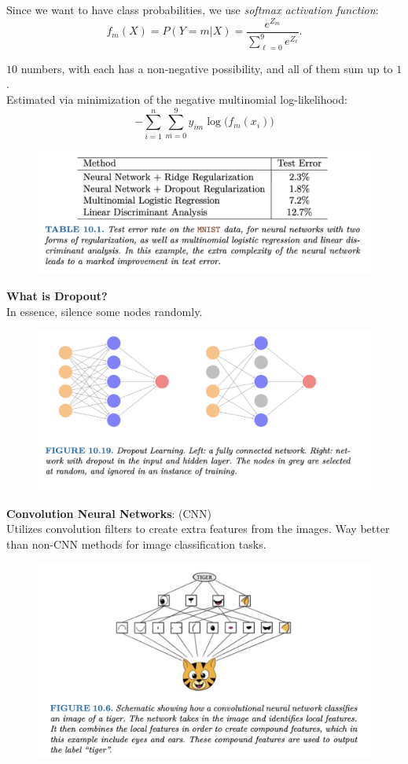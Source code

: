 \documentclass{article}
\begin{document}
Since we want to have class probabilities, we use \textit{softmax activation function}:\\
\[f_m(X) = P(Y = m | X) = \frac{e^{Z_m}}{\sum_{\ell = 0}^9 e^{Z_\ell}}.\]

$10$ numbers, with each has a non-negative possibility, and all of them sum up to $1$.\\

Estimated via minimization of the negative multinomial log-likelihood:\\
\[-\sum_{i=1}^n\sum_{m=0}^9 y_{im}\log\big(f_m(x_i)\big)\]

\begin{figure}[h!]
    \centering
    \includegraphics[width=0.75\linewidth]{strategies.png}
\end{figure}

\textbf{What is Dropout?}\\

In essence, silence some nodes randomly.\\

\begin{figure}[h!]
    \centering
    \includegraphics[width=0.75\linewidth]{Drouput.png}
\end{figure}

\textbf{Convolution Neural Networks}: (CNN)\\

Utilizes convolution filters to create extra features from the images. Way better than non-CNN methods for image classification tasks.

\newpage 
\begin{figure}[h!]
    \centering
    \includegraphics[width=0.75\linewidth]{logistic_CNN.png}
\end{figure}
\end{document}
